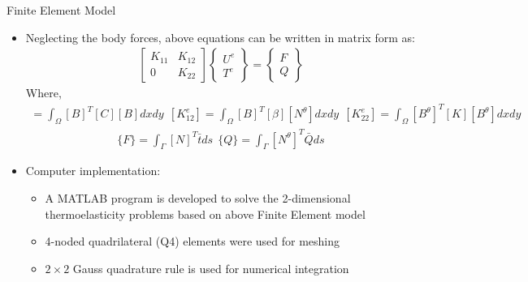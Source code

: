 \documentclass{beamer}
\begin{document}
\begin{frame}[t,fragile]{Finite Element Model}
    \vspace{-.3cm}
    \footnotesize
    \begin{itemize}
         \item Neglecting the body forces, above equations can be written in matrix form as: 
    \begin{align*}
\begin{bmatrix}
    K_{11} & K_{12} \\
    0 & K_{22}
\end{bmatrix}
\begin{Bmatrix}
    U^e\\ T^e
\end{Bmatrix}=
\begin{Bmatrix}
    F\\ Q
\end{Bmatrix}
\end{align*} 
Where,
\vspace{-.2cm}
    \scriptsize 
\begin{align*}
    [K_{11}^e]=\int_{\Omega}[B]^T[C][B]dxdy\ \
    [K_{12}^e]=\int_{\Omega}[B]^T[\beta][N^{\theta}]dxdy\ \
    [K_{22}^e]=\int_{\Omega}[B^{\theta}]^T[K][B^{\theta}]dxdy
\end{align*}
\vspace{-.5cm}
\begin{align*}
    \{F\}=\int_\Gamma [N]^T{\bar{t}}ds\ \
    \{Q\}=\int_\Gamma [N^{\theta}]^T\bar{Q}ds
\end{align*} 
\item \large{Computer implementation:}
    \begin{itemize}
\footnotesize
        \item A MATLAB program is developed to solve the 2-dimensional thermoelasticity problems based on above Finite Element model 
        \item 4-noded quadrilateral (Q4) elements were used for meshing 
        \item  $2\times 2$ Gauss quadrature rule is used for numerical integration
    \end{itemize}
\end{itemize}
\end{frame}
\end{document}
